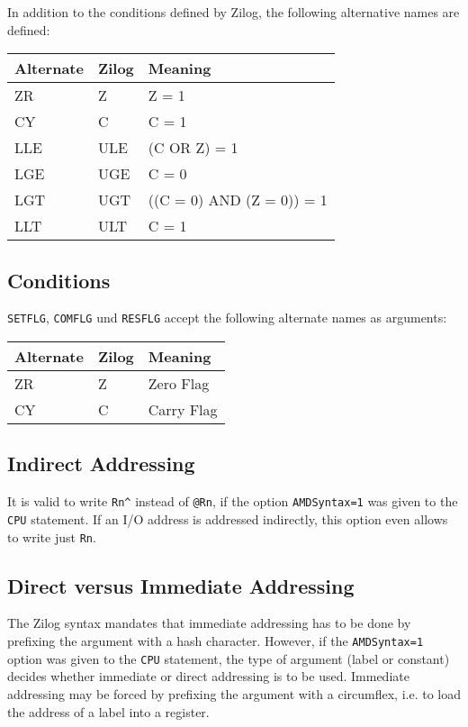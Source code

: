 \documentclass[12pt,twoside]{report}
\newcommand{\tty}[1]{{\tt #1}}
\begin{document}
In addition to the conditions defined by Zilog, the following alternative names
are defined:

\begin{center}\begin{tabular}{|l|l|l|}
\hline
Alternate & Zilog & Meaning \\
\hline
\hline
ZR         & Z     & Z = 1 \\
CY         & C     & C = 1 \\
LLE        & ULE   & (C OR Z) = 1 \\
LGE        & UGE   & C = 0 \\
LGT        & UGT   & ((C = 0) AND (Z = 0)) = 1 \\
LLT        & ULT   & C = 1 \\
\hline
\end{tabular}\end{center}

\subsection{Conditions}

\tty{SETFLG}, \tty{COMFLG} und \tty{RESFLG} accept the following alternate names
as arguments:

\begin{center}\begin{tabular}{|l|l|l|}
\hline
Alternate & Zilog & Meaning \\
\hline
\hline
ZR         & Z     & Zero Flag \\
CY         & C     & Carry Flag \\
\hline
\end{tabular}\end{center}

\subsection{Indirect Addressing}

It is valid to write \verb!Rn^! instead of \verb!@Rn!, if the option
\tty{AMDSyntax=1} was given to the \tty{CPU} statement.  If an I/O address
is addressed indirectly, this option even allows to write just \verb!Rn!.

\subsection{Direct versus Immediate Addressing}

The Zilog syntax mandates that immediate addressing has to be done by prefixing
the argument with a hash character.  However, if the \tty{AMDSyntax=1} option
was given to the \tty{CPU} statement, the type of argument (label or constant)
decides whether immediate or direct addressing is to be used.  Immediate addressing
may be forced by prefixing the argument with a circumflex, i.e. to load the address
of a label into a register.
\end{document}
